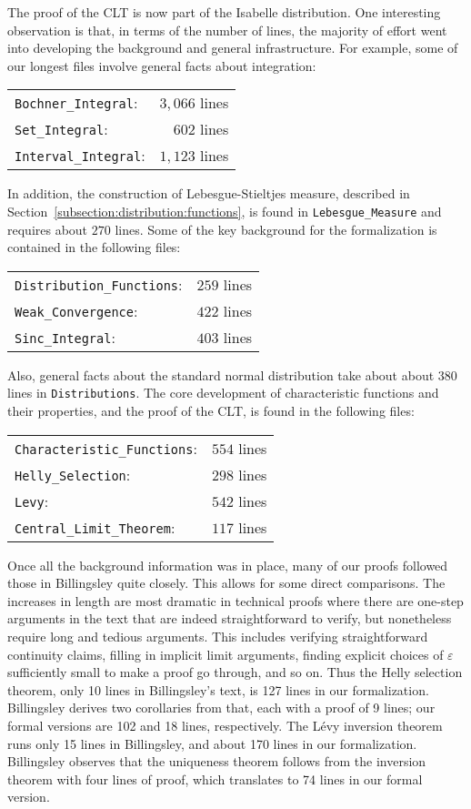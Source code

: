 \documentclass{svjour3}
\begin{document}
The proof of the CLT is now part of the Isabelle distribution. One interesting observation is that, in terms of the number of lines, the majority of effort went into developing the background and general infrastructure. For example, some of our longest files involve general facts about integration:
\begin{center}
\begin{tabular}{lr}
\verb=Bochner_Integral=: & $3,066$ lines \\
\verb=Set_Integral=: & $602$ lines \\
\verb=Interval_Integral=: & $1,123$ lines
\end{tabular}
\end{center}
In addition, the construction of Lebesgue-Stieltjes measure, described in Section~\ref{subsection:distribution:functions}, is found in \verb=Lebesgue_Measure= and requires about $270$ lines. Some of the key background for the formalization is contained in the following files:
\begin{center}
\begin{tabular}{lr}
 \verb=Distribution_Functions=: & $259$ lines \\
 \verb=Weak_Convergence=: & $422$ lines \\
 \verb=Sinc_Integral=: & $403$ lines
\end{tabular}
\end{center}
Also, general facts about the standard normal distribution take about about $380$ lines in \texttt{Distributions}. The core development of characteristic functions and their properties, and the proof of the CLT, is found in the following files:
\begin{center}
\begin{tabular}{lr}
 \verb=Characteristic_Functions=: & $554$ lines \\
 \verb=Helly_Selection=: & $298$ lines \\
 \verb=Levy=: & $542$ lines \\
 \verb=Central_Limit_Theorem=: & $117$ lines
\end{tabular}
\end{center}
Once all the background information was in place, many of our proofs followed those in Billingsley quite closely. This allows for some direct comparisons. The increases in length are most dramatic in technical proofs where there are one-step arguments in the text that are indeed straightforward to verify, but nonetheless require long and tedious arguments. This includes verifying straightforward continuity claims, filling in implicit limit arguments, finding explicit choices of $\varepsilon$ sufficiently small to make a proof go through, and so on. Thus the Helly selection theorem, only 10 lines in Billingsley's text, is 127 lines in our formalization. Billingsley derives two corollaries from that, each with a proof of 9 lines; our formal versions are 102 and 18 lines, respectively. The L\'evy inversion theorem runs only 15 lines in Billingsley, and about 170 lines in our formalization. Billingsley observes that the uniqueness theorem follows from the inversion theorem with four lines of proof, which translates to 74 lines in our formal version.
\end{document}
